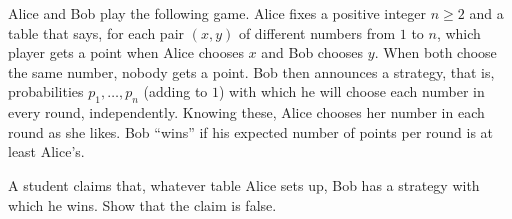 Alice and Bob play the following game. Alice fixes a positive integer $n\ge2$ and a table that says, for each pair $(x,y)$ of different numbers from $1$ to $n$, which player gets a point when Alice chooses $x$ and Bob chooses $y$. When both choose the same number, nobody gets a point. Bob then announces a strategy, that is, probabilities $p_1,\dots,p_n$ (adding to $1$) with which he will choose each number in every round, independently. Knowing these, Alice chooses her number in each round as she likes. Bob ``wins'' if his expected number of points per round is at least Alice's.

A student claims that, whatever table Alice sets up, Bob has a strategy with which he wins. Show that the claim is false.
